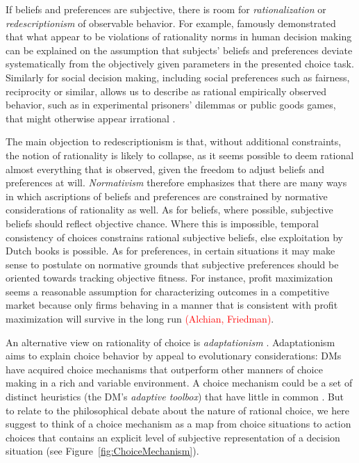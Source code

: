 \documentclass[fleqn,reqno,11pt]{article}
\newcommand{\myalert}[1]{\textcolor{red}{#1}}
\begin{document}
If beliefs and preferences are subjective, there is room for \emph{rationalization} or
\emph{redescriptionism} of observable behavior. For example,
\citet{KahnemannTversky1979:Prospect-Theory} famously demonstrated that what appear to be
violations of rationality norms in human decision making can be explained on the assumption
that subjects' beliefs and preferences deviate systematically from the objectively given
parameters in the presented choice task. Similarly for social decision making, including social
preferences such as fairness, reciprocity or similar, allows us to describe as rational
empirically observed behavior, such as in experimental prisoners' dilemmas or public goods
games, that might otherwise appear irrational \citep[e.g.,][]{fehrschmidt99,charrab02}.

The main objection to redescriptionism is that, without additional constraints, the notion of
rationality is likely to collapse, as it seems possible to deem rational almost everything that
is observed, given the freedom to adjust beliefs and preferences at will. \emph{Normativism}
therefore emphasizes that there are many ways in which ascriptions of beliefs and preferences
are constrained by normative considerations of rationality as well. As for beliefs, where
possible, subjective beliefs should reflect objective chance. Where this is impossible,
temporal consistency of choices constrains rational subjective beliefs, else exploitation by
Dutch books is possible. As for preferences, in certain situations it may make sense to
postulate on normative grounds that subjective preferences should be oriented towards tracking
objective fitness. For instance, profit maximization seems a reasonable assumption for
characterizing outcomes in a competitive market because only firms behaving in a manner that is
consistent with profit maximization will survive in the long run \myalert{(Alchian,
  Friedman)}.

An alternative view on rationality of choice is \emph{adaptationism}
\citep[e.g.,][]{Anderson1991:Is-human-cognit,ChaterOaksford2000:The-Rational-An,HagenChater2012:Decision-Making}.  Adaptationism aims to explain choice behavior by appeal to evolutionary
considerations: DMs have acquired choice mechanisms that outperform other manners of choice
making in a rich and variable environment. A choice mechanism could be a set of distinct
heuristics (the DM's \emph{adaptive toolbox}) that have little in common
\citep[e.g.,][]{TverskyKahnemann1981:The-Framing-of-,GigerenzerGoldstein1996:Reasoning-the-F,ScheibehenneRieskamp2013:Testing-the-Ada}. But
to relate to the philosophical debate about the nature of rational choice, we here suggest to
think of a choice mechanism as a map from choice situations to action choices that contains an
explicit level of subjective representation of a decision situation (see
Figure~\ref{fig:ChoiceMechanism}).
\end{document}

